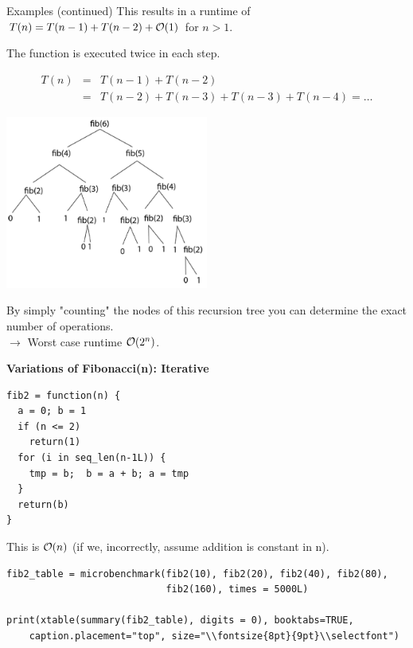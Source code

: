 \documentclass[11pt,compress,t,notes=noshow, xcolor=table]{beamer}
\begin{document}
\begin{vbframe}{Examples (continued)}
This results in a runtime of $T(n) = T(n-1) + T(n-2) + \mathcal{O}(1)$ for $n >1$.

\lz

The function is executed twice in each step.

\begin{eqnarray*}
  T(n) &=& T(n-1) + T(n-2)  \\
  &=& T(n-2) + T(n-3) + T(n-3) + T(n-4) = \ldots
\end{eqnarray*}

\framebreak

\begin{center}
\includegraphics[width=0.5\textwidth]{figure_man/fibonacci.png}
\end{center}

By simply "counting" the nodes of this recursion tree you can determine the exact number of operations. \\
$\to$ Worst case runtime $\mathcal{O}(2^n)$.

\framebreak


\textbf{Variations of Fibonacci(n): Iterative}
\begin{scriptsize}
\begin{verbatim}
fib2 = function(n) {
  a = 0; b = 1
  if (n <= 2)
    return(1)
  for (i in seq_len(n-1L)) {
    tmp = b;  b = a + b; a = tmp
  }
  return(b)
}
\end{verbatim}
\end{scriptsize}
This is $\mathcal{O}(n)$ (if we, incorrectly, assume addition is constant in n).

\framebreak
\begin{scriptsize}
\begin{verbatim}
fib2_table = microbenchmark(fib2(10), fib2(20), fib2(40), fib2(80), 
                            fib2(160), times = 5000L)

print(xtable(summary(fib2_table), digits = 0), booktabs=TRUE, 
    caption.placement="top", size="\\fontsize{8pt}{9pt}\\selectfont")
\end{verbatim}


\end{scriptsize}
\end{vbframe}
\end{document}
